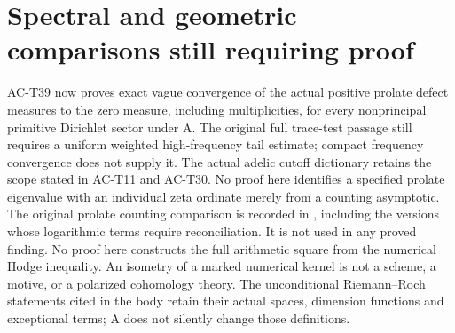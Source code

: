 \documentclass[11pt,a4paper]{article}
\theoremstyle{definition}
\theoremstyle{remark}
\begin{document}
\section{Spectral and geometric comparisons still requiring proof}
AC-T39 now proves exact vague convergence of the actual positive
prolate defect measures to the zero measure, including multiplicities,
for every nonprincipal primitive Dirichlet sector under A.
The original full trace-test passage still requires a uniform
weighted high-frequency tail estimate; compact frequency convergence
does not supply it. The actual adelic cutoff dictionary retains
the scope stated in AC-T11 and AC-T30.
No proof here identifies a specified prolate eigenvalue
with an individual zeta ordinate merely from a counting
asymptotic. The original prolate counting comparison is
recorded in ,
including the versions whose logarithmic terms require
reconciliation. It is not used in any proved finding.
No proof here constructs the full arithmetic square
from the numerical Hodge inequality. An isometry of a
marked numerical kernel is not a scheme, a motive, or
a polarized cohomology theory. The unconditional
Riemann--Roch statements cited in the body retain their
actual spaces, dimension functions and exceptional
terms; A does not silently change those definitions.
\end{document}
